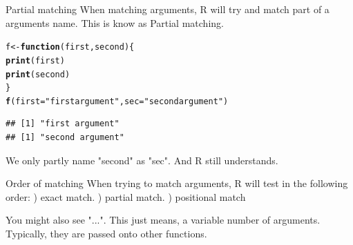 \documentclass{beamer}\usepackage[]{graphicx}\usepackage[]{color}
\makeatletter
\newcommand{\hlstr}[1]{\textcolor[rgb]{0.192,0.494,0.8}{#1}}%
\newcommand{\hlstd}[1]{\textcolor[rgb]{0.345,0.345,0.345}{#1}}%
\newcommand{\hlkwa}[1]{\textcolor[rgb]{0.161,0.373,0.58}{\textbf{#1}}}%
\newcommand{\hlkwb}[1]{\textcolor[rgb]{0.69,0.353,0.396}{#1}}%
\newcommand{\hlkwc}[1]{\textcolor[rgb]{0.333,0.667,0.333}{#1}}%
\newcommand{\hlkwd}[1]{\textcolor[rgb]{0.737,0.353,0.396}{\textbf{#1}}}%
\newenvironment{kframe}{%
 \def\at@end@of@kframe{}%
 \ifinner\ifhmode%
  \def\at@end@of@kframe{\end{minipage}}%
  \begin{minipage}{\columnwidth}%
 \fi\fi%
 \def\FrameCommand##1{\hskip\@totalleftmargin \hskip-\fboxsep
 \colorbox{shadecolor}{##1}\hskip-\fboxsep
     \hskip-\linewidth \hskip-\@totalleftmargin \hskip\columnwidth}%
 \MakeFramed {\advance\hsize-\width
   \@totalleftmargin\z@ \linewidth\hsize
   \@setminipage}}%
 {\par\unskip\endMakeFramed%
 \at@end@of@kframe}
\newenvironment{knitrout}{}{} %
\makeatother
\begin{document}
\begin{frame}[fragile]{Partial matching}
When matching arguments, R will try and match part of a arguments name. This is know as Partial matching.
\begin{knitrout}
\color{fgcolor}\begin{kframe}
\begin{alltt}
\hlstd{f} \hlkwb{<-} \hlkwa{function}\hlstd{(}\hlkwc{first}\hlstd{,} \hlkwc{second}\hlstd{) \{}
    \hlkwd{print}\hlstd{(first)}
    \hlkwd{print}\hlstd{(second)}
\hlstd{\}}
\hlkwd{f}\hlstd{(}\hlkwc{first} \hlstd{=} \hlstr{"first argument"}\hlstd{,} \hlkwc{sec} \hlstd{=} \hlstr{"second argument"}\hlstd{)}
\end{alltt}
\begin{verbatim}
## [1] "first argument"
## [1] "second argument"
\end{verbatim}
\end{kframe}
\end{knitrout}

We only partly name "second" as "sec". And R still understands.
\end{frame}

\begin{frame}[fragile]{Order of matching}
\linebreak
When trying to match arguments, R will test in the following order:
) exact match.
) partial match.
) positional match
\end{frame}

\begin{frame}[fragile]{}
You might also see "...".
\linebreak
This just means, a variable number of arguments. Typically, they are passed onto other functions.
\end{frame}
\end{document}
